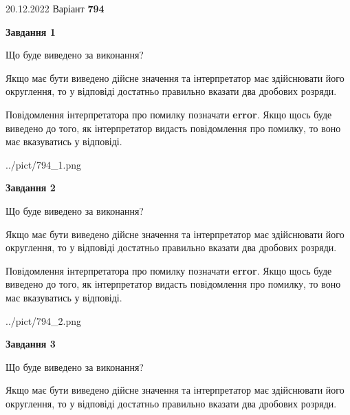 \documentclass[12pt, ukrainian]{article}
\begin{document}
{20.12.2022 Варіант \No \textbf { 794 }\par}
{
\begin {Large}

{\begin {center}\textbf{Завдання 1}\end {center}}\par
Що буде виведено за виконання? \par

Якщо має бути виведено дійсне значення та інтерпретатор має здійснювати його округлення, 
то у відповіді достатньо правильно вказати два дробових розряди.

Повідомлення інтерпретатора про помилку позначати \textbf{error}.
Якщо щось буде виведено до того, як інтерпретатор видасть повідомлення про помилку, 
то воно має вказуватись у відповіді. \par

\begin{center}
	{../pict/794_1.png}
\end{center}
\newpage

{\begin {center}\textbf{Завдання 2}\end {center}}\par
Що буде виведено за виконання? \par

Якщо має бути виведено дійсне значення та інтерпретатор має здійснювати його округлення, 
то у відповіді достатньо правильно вказати два дробових розряди.

Повідомлення інтерпретатора про помилку позначати \textbf{error}.
Якщо щось буде виведено до того, як інтерпретатор видасть повідомлення про помилку, 
то воно має вказуватись у відповіді. \par

\begin{center}
	{../pict/794_2.png}
\end{center}
\newpage

{\begin {center}\textbf{Завдання 3}\end {center}}\par
Що буде виведено за виконання? \par

Якщо має бути виведено дійсне значення та інтерпретатор має здійснювати його округлення, 
то у відповіді достатньо правильно вказати два дробових розряди.


\end{Large}}
\end{document}
